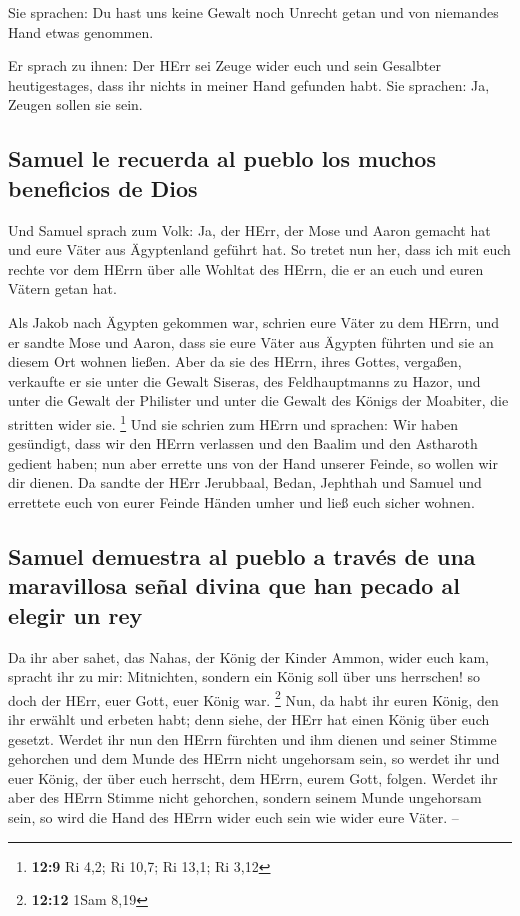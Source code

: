  Sie sprachen: Du hast uns keine Gewalt noch Unrecht getan
und von niemandes Hand etwas genommen.

 Er sprach zu ihnen: Der HErr sei Zeuge wider euch und
sein Gesalbter heutigestages, dass ihr nichts in meiner Hand gefunden
habt. Sie sprachen: Ja, Zeugen sollen sie sein.

\hypertarget{samuel-le-recuerda-al-pueblo-los-muchos-beneficios-de-dios}{%
\subsection{Samuel le recuerda al pueblo los muchos beneficios de
Dios}\label{samuel-le-recuerda-al-pueblo-los-muchos-beneficios-de-dios}}

 Und Samuel sprach zum Volk: Ja, der HErr, der Mose und
Aaron gemacht hat und eure Väter aus Ägyptenland geführt hat.
 So tretet nun her, dass ich mit euch rechte vor dem HErrn
über alle Wohltat des HErrn, die er an euch und euren Vätern getan hat.

 Als Jakob nach Ägypten gekommen war, schrien eure Väter
zu dem HErrn, und er sandte Mose und Aaron, dass sie eure Väter aus
Ägypten führten und sie an diesem Ort wohnen ließen.  Aber
da sie des HErrn, ihres Gottes, vergaßen, verkaufte er sie unter die
Gewalt Siseras, des Feldhauptmanns zu Hazor, und unter die Gewalt der
Philister und unter die Gewalt des Königs der Moabiter, die stritten
wider sie. \footnote{\textbf{12:9} Ri 4,2; Ri 10,7; Ri 13,1; Ri 3,12}
 Und sie schrien zum HErrn und sprachen: Wir haben
gesündigt, dass wir den HErrn verlassen und den Baalim und den Astharoth
gedient haben; nun aber errette uns von der Hand unserer Feinde, so
wollen wir dir dienen.  Da sandte der HErr Jerubbaal,
Bedan, Jephthah und Samuel und errettete euch von eurer Feinde Händen
umher und ließ euch sicher wohnen.

\hypertarget{samuel-demuestra-al-pueblo-a-travuxe9s-de-una-maravillosa-seuxf1al-divina-que-han-pecado-al-elegir-un-rey}{%
\subsection{Samuel demuestra al pueblo a través de una maravillosa señal
divina que han pecado al elegir un
rey}\label{samuel-demuestra-al-pueblo-a-travuxe9s-de-una-maravillosa-seuxf1al-divina-que-han-pecado-al-elegir-un-rey}}

 Da ihr aber sahet, das Nahas, der König der Kinder
Ammon, wider euch kam, spracht ihr zu mir: Mitnichten, sondern ein König
soll über uns herrschen! so doch der HErr, euer Gott, euer König war.
\footnote{\textbf{12:12} 1Sam 8,19}  Nun, da habt ihr
euren König, den ihr erwählt und erbeten habt; denn siehe, der HErr hat
einen König über euch gesetzt.  Werdet ihr nun den HErrn
fürchten und ihm dienen und seiner Stimme gehorchen und dem Munde des
HErrn nicht ungehorsam sein, so werdet ihr und euer König, der über euch
herrscht, dem HErrn, eurem Gott, folgen.  Werdet ihr aber
des HErrn Stimme nicht gehorchen, sondern seinem Munde ungehorsam sein,
so wird die Hand des HErrn wider euch sein wie wider eure Väter. --


